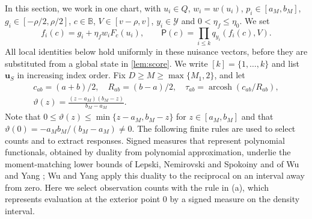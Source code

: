 In this section, we work in one chart, with $u_i\in Q$, $w_i=w(u_i)$,
$p_i\in[a_M,b_M]$, $g_i\in[-\rho/2,\rho/2]$,
$c\in\mathbb B$, $V\in[v-\rho,v]$, $y_i\in\mathcal Y$ and
$0<\eta_f\le\eta_0$. We set
\[
 f_i(c)=g_i+\eta_fw_iF_c(u_i),\qquad
 \mathsf P(c)=\prod_{i\le k}q_{y_i}(f_i(c),V).
\]
All local identities below hold uniformly in these nuisance vectors,
before they are substituted from a global state in \cref{lem:score}.
We write $[k]=\{1,\ldots,k\}$ and list $\mathbf u_S$ in increasing
index order. Fix $D\ge M\ge\max\{M_1,2\}$, and let
\[
 \begin{gathered}
 c_{ab}=(a+b)/2,\quad R_{ab}=(b-a)/2,\quad
 \tau_{ab}=\operatorname{arcosh}(c_{ab}/R_{ab}),\\
 \vartheta(z)=\frac{(z-a_M)(b_M-z)}{b_M-a_M}.
 \end{gathered}
\]
Note that $0\le\vartheta(z)\le\min\{z-a_M,b_M-z\}$ for $z\in[a_M,b_M]$ and that
$\vartheta(0)=-a_Mb_M/(b_M-a_M)\ne0$. The following finite rules are
used to select counts and to extract responses. Signed measures that
represent polynomial functionals, obtained by duality from polynomial
approximation, underlie the moment-matching lower bounds of Lepski,
Nemirovski and Spokoiny \cite[Section~4.4]{LepskiEtAl1999} and of Wu
and Yang \cite{WuYang2016}; Wu and Yang
\cite[Appendix~A, Lemma~5]{WuYang2019} apply this duality to the
reciprocal on an interval away from zero. Here we select observation counts with the
rule in (a), which represents evaluation at the exterior point $0$ by a
signed measure on the density interval.

